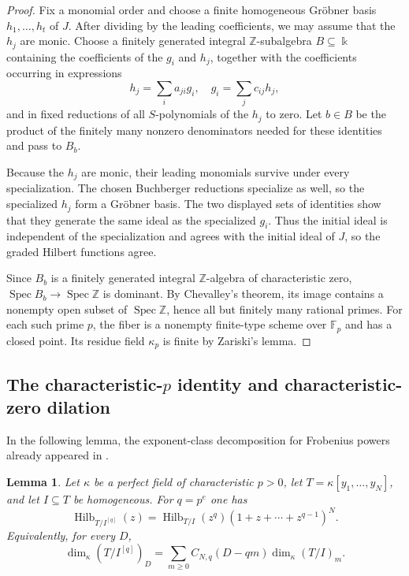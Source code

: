 \documentclass[11pt]{amsart}
\newtheorem{lemma}[theorem]{Lemma}
\theoremstyle{remark}
\newcommand{\kk}{\Bbbk}
\newcommand{\ZZ}{\mathbb Z}
\newcommand{\Spec}{\operatorname{Spec}}
\newcommand{\Hilb}{\operatorname{Hilb}}
\begin{document}
\begin{proof}
Fix a monomial order and choose a finite homogeneous Gr\"obner basis $h_1,\ldots,h_t$ of $J$. After dividing by the leading coefficients, we may assume that the $h_j$ are monic. Choose a finitely generated integral $\ZZ$-subalgebra $B\subseteq\kk$ containing the coefficients of the $g_i$ and $h_j$, together with the coefficients occurring in expressions
$$
h_j=\sum_i a_{ji}g_i,
\quad
g_i=\sum_j c_{ij}h_j,
$$
and in fixed reductions of all $S$-polynomials of the $h_j$ to zero. Let $b\in B$ be the product of the finitely many nonzero denominators needed for these identities and pass to $B_b$.

Because the $h_j$ are monic, their leading monomials survive under every specialization. The chosen Buchberger reductions specialize as well, so the specialized $h_j$ form a Gr\"obner basis. The two displayed sets of identities show that they generate the same ideal as the specialized $g_i$. Thus the initial ideal is independent of the specialization and agrees with the initial ideal of $J$, so the graded Hilbert functions agree.

Since $B_b$ is a finitely generated integral $\ZZ$-algebra of characteristic zero, $\Spec B_b\to\Spec\ZZ$ is dominant. By Chevalley's theorem, its image contains a nonempty open subset of $\Spec\ZZ$, hence all but finitely many rational primes. For each such prime $p$, the fiber is a nonempty finite-type scheme over $\mathbb F_p$ and has a closed point. Its residue field $\kappa_p$ is finite by Zariski's lemma.
\end{proof}

\subsection{The characteristic-\texorpdfstring{$p$}{p} identity and characteristic-zero dilation}

In the following lemma, the exponent-class decomposition for Frobenius powers already appeared in \cite[Lemma~3.5]{HaSivakumar}.

\begin{lemma}\label{lem:HF-charp}
Let $\kappa$ be a perfect field of characteristic $p>0$, let $T=\kappa[y_1,\ldots,y_N]$, and let $I\subseteq T$ be homogeneous. For $q=p^e$ one has
\begin{equation}\label{eq:HF-charp}
\Hilb_{T/I^{[q]}}(z)
=
\Hilb_{T/I}(z^q)(1+z+\cdots+z^{q-1})^N.
\end{equation}
Equivalently, for every $D$,
\begin{equation}\label{eq:HF-charp-coeff}
\dim_\kappa(T/I^{[q]})_D
=
\sum_{m\ge0}C_{N,q}(D-qm)\dim_\kappa(T/I)_m.
\end{equation}
\end{lemma}
\end{document}
